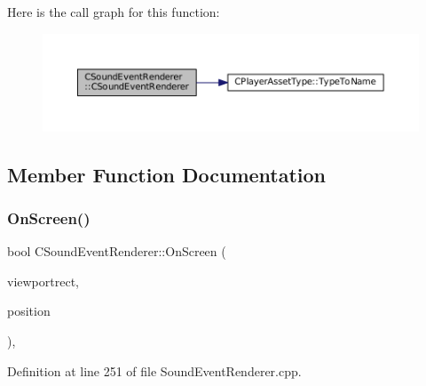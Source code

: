 Here is the call graph for this function\+:
\nopagebreak
\begin{figure}[H]
\begin{center}
\leavevmode
\includegraphics[width=350pt]{classCSoundEventRenderer_a2a1c105a120bebf386b772a06c2a053a_cgraph}
\end{center}
\end{figure}


\subsection{Member Function Documentation}
\hypertarget{classCSoundEventRenderer_a9df97d476a3a39cb7126db9c366c2f0c}{}\label{classCSoundEventRenderer_a9df97d476a3a39cb7126db9c366c2f0c} 
\subsubsection{\texorpdfstring{On\+Screen()}{OnScreen()}}
{\footnotesize\ttfamily bool C\+Sound\+Event\+Renderer\+::\+On\+Screen (\begin{DoxyParamCaption}\item[{const \hyperlink{structSRectangle}{S\+Rectangle} \&}]{viewportrect,  }\item[{const \hyperlink{classCPosition}{C\+Position} \&}]{position }\end{DoxyParamCaption})\hspace{0.3cm}{\ttfamily [static]}, {\ttfamily [protected]}}



Definition at line 251 of file Sound\+Event\+Renderer.\+cpp.


